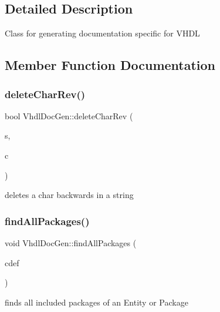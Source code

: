 \subsection{Detailed Description}
Class for generating documentation specific for V\+H\+DL 

\subsection{Member Function Documentation}
\mbox{\label{class_vhdl_doc_gen_a82a05cf7bd081febd19a0065eed17098}} 
\subsubsection{\texorpdfstring{deleteCharRev()}{deleteCharRev()}}
{\footnotesize\ttfamily bool Vhdl\+Doc\+Gen\+::delete\+Char\+Rev (\begin{DoxyParamCaption}\item[{\mbox{\hyperlink{class_q_c_string}{Q\+C\+String}} \&}]{s,  }\item[{char}]{c }\end{DoxyParamCaption})\hspace{0.3cm}{\ttfamily [static]}}

deletes a char backwards in a string \mbox{\label{class_vhdl_doc_gen_a00216e37afbb1841a9631a80379b7f0a}} 
\subsubsection{\texorpdfstring{findAllPackages()}{findAllPackages()}}
{\footnotesize\ttfamily void Vhdl\+Doc\+Gen\+::find\+All\+Packages (\begin{DoxyParamCaption}\item[{\mbox{\hyperlink{class_class_def}{Class\+Def}} $\ast$}]{cdef }\end{DoxyParamCaption})\hspace{0.3cm}{\ttfamily [static]}}

finds all included packages of an Entity or Package \mbox{\label{class_vhdl_doc_gen_aded31b275385b372f3bb0d4182dd990e}} 
